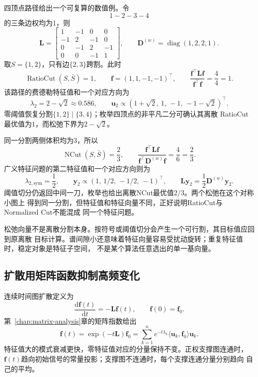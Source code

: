 四顶点路径给出一个可复算的数值例。令
\[
  1\mathbin{-}2\mathbin{-}3\mathbin{-}4
\]
的三条边权均为\(1\)，则
\[
  \bm{L}=
  \begin{bmatrix}
    1&-1&0&0\\
    -1&2&-1&0\\
    0&-1&2&-1\\
    0&0&-1&1
  \end{bmatrix},
  \qquad
  \bm{D}^{(w)}=\operatorname{diag}(1,2,2,1).
\]
取\(S=\{1,2\}\)，只有边\(\{2,3\}\)跨割。此时
\[
  \operatorname{RatioCut}(S,\bar S)=1,\qquad
  \bm{f}=(1,1,-1,-1)^{\top},\qquad
  \frac{\bm{f}^{\top}\bm{L}\bm{f}}{\bm{f}^{\top}\bm{f}}
  =\frac44=1.
\]
该路径的费德勒特征值和一个对应方向为
\[
  \lambda_2=2-\sqrt2\approx0.586,\qquad
  \bm{u}_2\propto
  (1+\sqrt2,\,1,\,-1,\,-1-\sqrt2)^{\top}.
\]
零阈值恢复分割\(\{1,2\}\mid\{3,4\}\)；枚举四顶点的非平凡二分可确认其离散
RatioCut最优值为\(1\)，而松弛下界为\(2-\sqrt2\)。

同一分割两侧体积均为\(3\)，所以
\[
  \operatorname{NCut}(S,\bar S)=\frac23,\qquad
  \frac{\bm{f}^{\top}\bm{L}\bm{f}}
       {\bm{f}^{\top}\bm{D}^{(w)}\bm{f}}
  =\frac46=\frac23.
\]
广义特征问题的第二特征值和一个对应方向则为
\[
  \lambda_{2,\mathrm{sym}}=\frac12,\qquad
  \bm{y}_2\propto(1,\,1/2,\,-1/2,\,-1)^{\top},
  \qquad
  \bm{L}\bm{y}_2=\frac12\bm{D}^{(w)}\bm{y}_2.
\]
阈值切分仍返回中间一刀，枚举也给出离散NCut最优值\(2/3\)。两个松弛在这个对称小图上
得到同一分割，但特征值和特征向量不同，正好说明RatioCut与Normalized Cut不能混成
同一个特征问题。

松弛向量不是离散分割本身。按符号或阈值切分会产生一个可行割，其目标值应回到原离散
目标计算。谱间隙小还意味着特征向量容易受扰动旋转；重复特征值时，稳定对象是特征子空间，
不是某个算法任意选出的单一基向量。

\subsection{扩散用矩阵函数抑制高频变化}

连续时间图扩散定义为
\begin{equation}
  \frac{\mathrm{d}\bm{f}(t)}{\mathrm{d}t}
  =-\bm{L}\bm{f}(t),
  \qquad
  \bm{f}(0)=\bm{f}_0.
  \label{eq:graph-theory-heat-equation}
\end{equation}
第~\ref{chap:matrix-analysis}章的矩阵指数给出
\[
  \bm{f}(t)=\exp(-t\bm{L})\bm{f}_0
  =\sum_{k=1}^{n}e^{-t\lambda_k}
  \langle\bm{u}_k,\bm{f}_0\rangle\bm{u}_k.
\]
特征值大的模式衰减更快，零特征值对应的分量保持不变。正权支撑图连通时，
\(\bm{f}(t)\)趋向初始信号的常量投影；支撑图不连通时，每个支撑连通分量分别趋向
自己的平均。

